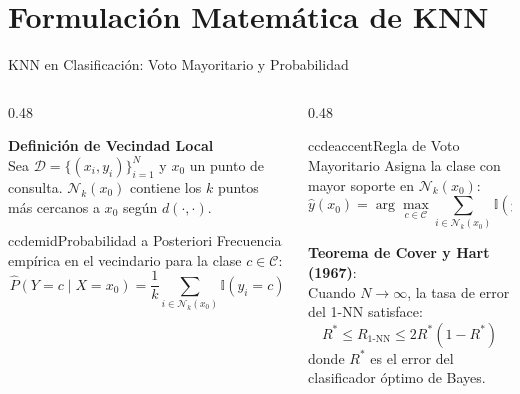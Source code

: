 \section{Formulación Matemática de KNN}

\begin{frame}{KNN en Clasificación: Voto Mayoritario y Probabilidad}
\begin{columns}[T,onlytextwidth]
\begin{column}{0.48\textwidth}
\begin{ccdebox}
\textbf{Definición de Vecindad Local}\\[0.06cm]
Sea $\mathcal{D} = \{(x_i, y_i)\}_{i=1}^N$ y $x_0$ un punto de consulta. $\mathcal{N}_k(x_0)$ contiene los $k$ puntos más cercanos a $x_0$ según $d(\cdot, \cdot)$.
\end{ccdebox}

\vspace{0.08cm}
\begin{contrastbox}{ccdemid}{Probabilidad a Posteriori}
\footnotesize
Frecuencia empírica en el vecindario para la clase $c \in \mathcal{C}$:
\[
\widehat{P}(Y = c \mid X = x_0) = \frac{1}{k} \sum_{i \in \mathcal{N}_k(x_0)} \mathbb{I}(y_i = c)
\]
\end{contrastbox}
\end{column}

\begin{column}{0.48\textwidth}
\begin{contrastbox}{ccdeaccent}{Regla de Voto Mayoritario}
\footnotesize
Asigna la clase con mayor soporte en $\mathcal{N}_k(x_0)$:
\[
\hat{y}(x_0) = \arg\max_{c \in \mathcal{C}} \sum_{i \in \mathcal{N}_k(x_0)} \mathbb{I}(y_i = c)
\]
\end{contrastbox}

\vspace{0.08cm}
\begin{keybox}
\scriptsize
\textbf{Teorema de Cover y Hart (1967)}:\\
Cuando $N \to \infty$, la tasa de error del 1-NN satisface:
\[ R^* \leq R_{1\text{-NN}} \leq 2R^*(1 - R^*) \]
donde $R^*$ es el error del clasificador óptimo de Bayes.
\end{keybox}
\end{column}
\end{columns}
\end{frame}

